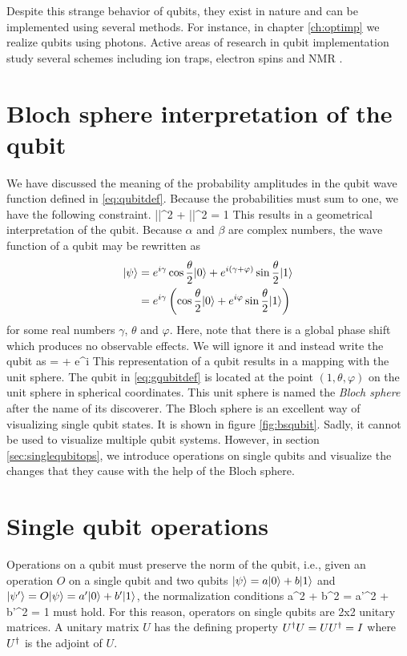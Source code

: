 Despite this strange behavior of qubits, they exist in nature and can be implemented using several methods. For instance, in chapter \ref{ch:optimp} we realize qubits using photons. Active areas of research in qubit implementation study several schemes including ion traps, electron spins and NMR \cite{nielsen2000}. 

\section{Bloch sphere interpretation of the qubit}
We have discussed the meaning of the probability amplitudes in the qubit wave function defined in \eqref{eq:qubitdef}. Because the probabilities must sum to one, we have the following constraint.
\beq
|\alpha|^2 + |\beta|^2 = 1
\eeq
This results in a geometrical interpretation of the qubit. Because $\alpha$ and $\beta$ are complex numbers, the wave function of a qubit may be rewritten as
\begin{align}
|\psi\rangle &= e^{i\gamma}\cos\frac{\theta}{2}|0\rangle + e^{i(\gamma + \varphi)}\sin\frac{\theta}{2}|1\rangle\\
&= e^{i\gamma}\left(\cos\frac{\theta}{2}|0\rangle + e^{i\varphi}\sin\frac{\theta}{2}|1\rangle\right)
\end{align}
for some real numbers $\gamma$, $\theta$ and $\varphi$. Here, note that there is a global phase shift which produces no observable effects. We will ignore it and instead write the qubit as
\beq
\label{eq:gqubitdef}
\ketp = \cos{} + e^{i\varphi}\sin{}
\eeq
{}
This representation of a qubit results in a mapping with the unit sphere. The qubit in \eqref{eq:gqubitdef} is located at the point $(1,\theta,\varphi)$ on the unit sphere in spherical coordinates. This unit sphere is named the \textit{Bloch sphere} after the name of its discoverer. The Bloch sphere is an excellent way of visualizing single qubit states. It is shown in figure \ref{fig:bsqubit}. Sadly, it cannot be used to visualize multiple qubit systems. However, in section \ref{sec:singlequbitops}, we introduce operations on single qubits and visualize the changes that they cause with the help of the Bloch sphere.

\section{Single qubit operations\label{sec:singlequbitops}}
Operations on a qubit must preserve the norm of the qubit, i.e., given an operation $O$ on a single qubit and two qubits $|\psi\rangle = a|0\rangle + b|1\rangle$ and $|\psi'\rangle = O|\psi\rangle = a'|0\rangle + b'|1\rangle$, the normalization conditions
\beq
a^2 + b^2 = a'^2 + b'^2 = 1
\eeq
must hold. For this reason, operators on single qubits are 2x2 unitary matrices. A unitary matrix $U$ has the defining property $U^\dagger U = UU^\dagger = I$ where $U^\dagger$ is the adjoint of $U$. 

